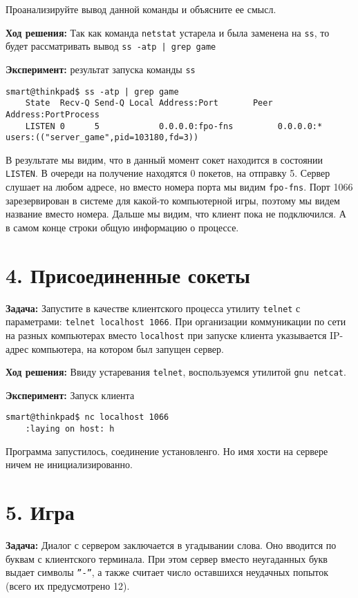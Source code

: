 Проанализируйте вывод данной команды и объясните ее смысл.

\textbf{Ход решения:} Так как команда \texttt{netstat} устарела и была заменена на \texttt{ss}, то будет рассматривать вывод \texttt{ss -atp | grep game}

\textbf{Эксперимент:} результат запуска команды \texttt{ss}
\begin{Verbatim}[frame=single]
    smart@thinkpad$ ss -atp | grep game
    State  Recv-Q Send-Q Local Address:Port       Peer Address:PortProcess
    LISTEN 0      5            0.0.0.0:fpo-fns         0.0.0.0:*    users:(("server_game",pid=103180,fd=3))
\end{Verbatim}

В результате мы видим, что в данный момент сокет находится в состоянии \texttt{LISTEN}. В очереди на получение находятся 0 покетов, на отправку 5. Сервер слушает на любом адресе, но вместо номера порта мы видим \texttt{fpo-fns}. Порт 1066 зарезервирован в системе для какой-то компьютерной игры, поэтому мы видем название вместо номера. Дальше мы видим, что клиент пока не подключился. А в самом конце строки общую информацию о процессе.

\section*{4. Присоединенные сокеты}
\textbf{Задача:} Запустите в качестве клиентского процесса утилиту \texttt{telnet} с параметрами: \texttt{telnet localhost 1066}. При организации коммуникации по сети на разных компьютерах вместо \texttt{localhost} при запуске клиента указывается IP-адрес компьютера, на котором был запущен сервер.

\textbf{Ход решения:} Ввиду устаревания \texttt{telnet}, воспользуемся утилитой \texttt{gnu netcat}.

\textbf{Эксперимент:} Запуск клиента
\begin{Verbatim}[frame=single]
    smart@thinkpad$ nc localhost 1066
    :laying on host: h
\end{Verbatim}
Программа запустилось, соединение установленго. Но имя хости на сервере ничем не инициализированно.

\section*{5. Игра}
\textbf{Задача:} Диалог с сервером заключается в угадывании слова. Оно вводится по буквам с клиентского терминала. При этом сервер вместо неугаданных букв выдает символы \texttt{”-”}, а также считает число оставшихся неудачных попыток (всего их предусмотрено 12).

